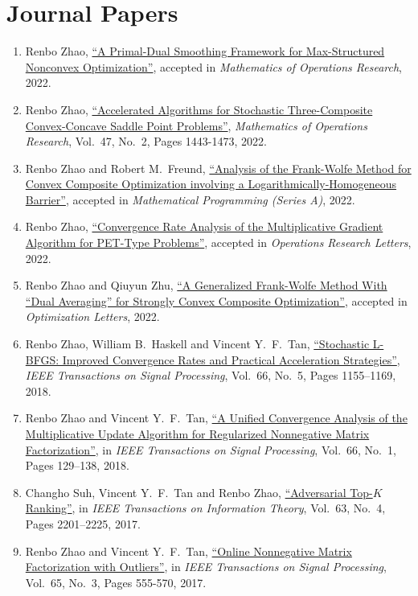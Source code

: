 \documentclass[11pt]{article}
\newcommand{\TSP}{IEEE Transactions on Signal Processing}
\newcommand{\TIT}{IEEE Transactions on Information Theory}
\newcommand{\MOR}{Mathematics of Operations Research}
\newcommand{\MPA}{Mathematical Programming (Series A)}
\newcommand{\ORL}{Operations Research Letters}
\newcommand{\OPTL}{Optimization Letters}
\begin{document}
\section*{\large Journal Papers}

\begin{enumerate}[label=J\arabic*.]\setlength{\leftskip}{2ex}
\item Renbo Zhao, \href{https://arxiv.org/abs/2003.04375}{``A Primal-Dual Smoothing Framework for Max-Structured Nonconvex Optimization''}, accepted in  {\em \MOR}, 2022. 
\item {Renbo Zhao},  \href{https://pubsonline.informs.org/doi/abs/10.1287/moor.2021.1175?journalCode=moor}{``Accelerated Algorithms for Stochastic Three-Composite Convex-Concave Saddle Point Problems''},  {\em \MOR}, Vol.\ 47, No.\ 2, Pages 1443-1473, 2022.
\item Renbo Zhao and Robert M.\ Freund,  \href{https://link.springer.com/article/10.1007/s10107-022-01820-9}{``Analysis of the Frank-Wolfe Method for Convex Composite Optimization involving a Logarithmically-Homogeneous Barrier''},  accepted in {\em \MPA}, 2022.
\item Renbo Zhao, \href{https://arxiv.org/abs/2109.05601}{``Convergence Rate Analysis of the Multiplicative Gradient Algorithm for PET-Type Problems''}, accepted in {\em \ORL}, 2022.
\item Renbo Zhao and Qiuyun Zhu, \href{https://link.springer.com/article/10.1007/s11590-022-01951-0}{``A Generalized Frank-Wolfe Method With “Dual Averaging” for Strongly Convex Composite Optimization''}, accepted in  {\em \OPTL}, 2022. 
\item {Renbo Zhao}, William B.\ Haskell and Vincent Y.\ F.\ Tan,  \href{https://ieeexplore.ieee.org/document/8219748}{``Stochastic L-BFGS: Improved Convergence Rates and Practical Acceleration Strategies''},    {\em \TSP}, Vol.\ 66, No.\ 5, Pages 1155–1169, 2018.
\item {Renbo Zhao} and Vincent Y.\ F.\ Tan,   \href{https://ieeexplore.ieee.org/document/8052526}{``A Unified Convergence Analysis of the Multiplicative Update Algorithm for Regularized Nonnegative Matrix Factorization''},  in {\em \TSP}, Vol.\ 66, No.\ 1, Pages 129–138, 2018.
\item Changho Suh, Vincent Y.\ F.\ Tan and {Renbo Zhao},   \href{https://ieeexplore.ieee.org/document/7835206}{``Adversarial Top-$K$ Ranking''},   in {\em \TIT}, Vol.\ 63, No.\ 4, Pages 2201–2225, 2017.
\item {Renbo Zhao} and Vincent Y.\ F.\ Tan,   \href{https://ieeexplore.ieee.org/document/7676413}{``Online Nonnegative Matrix Factorization with Outliers''},  in {\em \TSP}, Vol.\ 65, No.\ 3, Pages 555-570, 2017. 
\end{enumerate}
\end{document}
